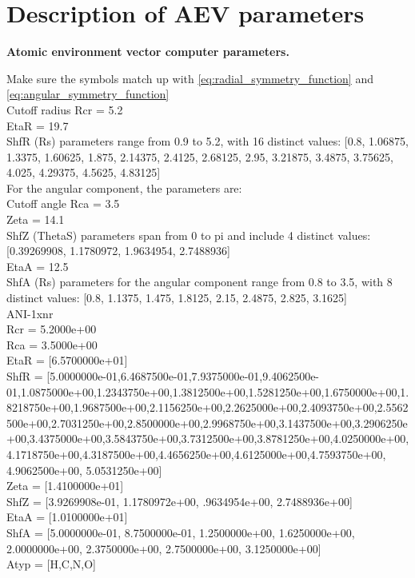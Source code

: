 \chapter{Description of AEV parameters}
\label{appendix:AEV_param}
{\bf Atomic environment vector computer parameters.}

Make sure the symbols match up with \ref{eq:radial_symmetry_function} and \ref{eq:angular_symmetry_function} \\




Cutoff radius Rcr = 5.2 \\
EtaR = 19.7 \\
ShfR (Rs) parameters range from 0.9 to 5.2, with 16 distinct values: [0.8, 1.06875, 1.3375, 1.60625, 1.875, 2.14375, 2.4125, 2.68125, 2.95, 3.21875, 3.4875, 3.75625, 4.025, 4.29375, 4.5625, 4.83125] \\
For the angular component, the parameters are: \\
Cutoff angle Rca = 3.5 \\
Zeta = 14.1 \\
ShfZ (ThetaS) parameters span from 0 to pi and include 4 distinct values: [0.39269908, 1.1780972, 1.9634954, 2.7488936] \\
EtaA = 12.5 \\
ShfA (Rs) parameters for the angular component range from 0.8 to 3.5, with 8 distinct values: [0.8, 1.1375, 1.475, 1.8125, 2.15, 2.4875, 2.825, 3.1625] \\

ANI-1xnr \\
Rcr = 5.2000e+00 \\
Rca = 3.5000e+00 \\ 
EtaR = [6.5700000e+01] \\
ShfR = [5.0000000e-01,6.4687500e-01,7.9375000e-01,9.4062500e-01,1.0875000e+00,1.2343750e+00,1.3812500e+00,1.5281250e+00,1.6750000e+00,1.8218750e+00,1.9687500e+00,2.1156250e+00,2.2625000e+00,2.4093750e+00,2.5562500e+00,2.7031250e+00,2.8500000e+00,2.9968750e+00,3.1437500e+00,3.2906250e+00,3.4375000e+00,3.5843750e+00,3.7312500e+00,3.8781250e+00,4.0250000e+00,4.1718750e+00,4.3187500e+00,4.4656250e+00,4.6125000e+00,4.7593750e+00, 4.9062500e+00, 5.0531250e+00] \\
Zeta = [1.4100000e+01] \\
ShfZ = [3.9269908e-01, 1.1780972e+00, .9634954e+00, 2.7488936e+00] \\
EtaA = [1.0100000e+01] \\
ShfA = [5.0000000e-01, 8.7500000e-01, 1.2500000e+00, 1.6250000e+00, 2.0000000e+00, 2.3750000e+00, 2.7500000e+00, 3.1250000e+00] \\
Atyp = [H,C,N,O] \\


